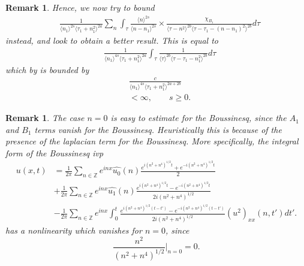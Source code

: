 \documentclass[12pt,reqno]{amsart}
\numberwithin{equation}{section}  %
\renewcommand{\cref}{\Cref}
\newcommand{\zz}{\mathbb{Z}}
\newcommand{\wh}{\widehat}
\newtheorem{remark}[theorem]{Remark}
\begin{document}
\begin{framed}
\begin{remark}
%
%
%
Hence, we now try to bound
\begin{equation}
\begin{split}
  & \frac{1}{\langle n_{1} \rangle ^{2s}
  \langle \tau_{1} + n_{1}^{2} \rangle
  ^{2a}} \sum_{n} \int_{\tau} \frac{\langle n \rangle ^{2s}}{\langle
  n - n_{1}\rangle ^{2s}}  \times \frac{\chi_{B_{1}}}{\langle
  \tau - n^{2}  \rangle^{2b}  \langle \tau - \tau_{1} - (n - n_{1})^{2}
  \rangle^{2b}} d \tau 
\end{split}
\end{equation}
instead, and look to obtain a better result. This is equal to 
%
\begin{equation*}
\begin{split}
  & \frac{1}{\langle n_{1} \rangle ^{4s}
  \langle \tau_{1} + n_{1}^{2} \rangle
  ^{2a}} \int_{\tau} \frac{1}{\langle
  \tau  \rangle^{2b}  \langle \tau - \tau_{1} - n_{1}^{2}
  \rangle^{2b}} d \tau
\end{split}
\end{equation*}
%
%
which by \cref{lem:calc} is bounded by
%
%
\begin{equation*}
\begin{split}
  & \frac{c}{\langle n_{1} \rangle ^{4s}
  \langle \tau_{1} + n_{1}^{2} \rangle
  ^{2a + 2b}}
\\
& < \infty, \qquad s \ge 0. 
\end{split}
\end{equation*}
%
\end{remark}
\end{framed}
%
%
\begin{framed}
\begin{remark}
The case $n=0$ is easy to estimate for the Boussinesq, since the
$A_{1}$ and $B_{1}$ terms vanish for the Boussinesq. Heuristically this is
because of the presence of the laplacian term for the Boussinesq. More
specifically, the integral form of the Boussinesq ivp
\begin{equation*}
  \begin{split}
    u(x,t)
    & = \frac{1}{2\pi}\sum_{n \in \zz} e^{inx} \wh{u_{0}}(n) \frac{e^{i(n^{2} + n^{4})^{1/2}t} + e^{-i(n^{2} + n^{4})^{1/2}t}}{2} 
    \\
    & + \frac{1}{2 \pi}\sum_{n \in \zz} e^{inx}
    \wh{u_{1}}(n)\frac{e^{i(n^{2} + n^{4})^{1/2}t} - e^{-i(n^{2} + n^{4})^{1/2}t}}{2 i (n^{2} +
    n^{4})^{1/2}} 
    \\
    & - \frac{1}{2 \pi}\sum_{n \in \zz} e^{inx}
    \int_{0}^{t}\frac{e^{i(n^{2} + n^{4})^{1/2}(t-t')}-e^{-i(n^{2} + n^{4})^{1/2}(t-t')}}{2 i (n^{2} +
    n^{4})^{1/2}}
    \wh{(u^{2})_{xx}}(n, t') dt'.
  \end{split}
\end{equation*}
has a nonlinearity which vanishes for $n =0$, since 
$$\frac{n^{2}}{(n^{2} + n^{4})^{1/2}} |_{n=0} = 0.$$ 
\label{rem:bous-easier}
\end{remark}
\end{framed}
\end{document}
